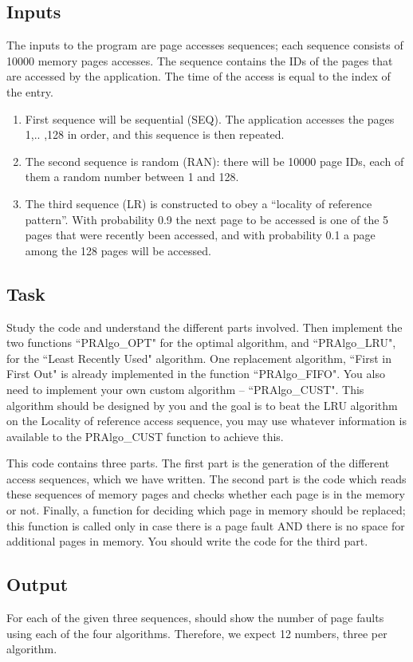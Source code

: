 \documentclass[letterpaper,10pt]{article}
\begin{document}
\subsection{Inputs}
The inputs to the program are page accesses sequences; each sequence consists of 10000
memory pages accesses. The sequence contains the IDs of the pages that are accessed by the
application. The time of the access is equal to the index of the entry.
\begin{enumerate}
\item First sequence will be sequential (SEQ). The application accesses the pages 1,.. ,128 in
order, and this sequence is then repeated.
\item The second sequence is random (RAN): there will be 10000 page IDs, each of them a
random number between 1 and 128.
\item The third sequence (LR) is constructed to obey a “locality of reference pattern”. With
probability 0.9 the next page to be accessed is one of the 5 pages that were recently
been accessed, and with probability 0.1 a page among the 128 pages will be accessed.
\end{enumerate}

\subsection{Task}
Study the code and understand the different parts involved. Then implement the two functions
``PRAlgo\_OPT" for the optimal algorithm, and ``PRAlgo\_LRU", for the ``Least Recently Used"
algorithm. One replacement algorithm, ``First in First Out" is already implemented in the
function ``PRAlgo\_FIFO". You also need to implement your own custom algorithm –
``PRAlgo\_CUST". This algorithm should be designed by you and the goal is to beat the LRU
algorithm on the Locality of reference access sequence, you may use whatever information is
available to the PRAlgo\_CUST function to achieve this.

This code contains three parts. The first part is the generation of the different access sequences,
which we have written. The second part is the code which reads these sequences of memory
pages and checks whether each page is in the memory or not. Finally, a function for deciding
which page in memory should be replaced; this function is called only in case there is a page
fault AND there is no space for additional pages in memory. You should write the code for the
third part.

\subsection{Output}
For each of the given three sequences, should show the number of page faults using each of the
four algorithms. Therefore, we expect 12 numbers, three per algorithm.
\end{document}
